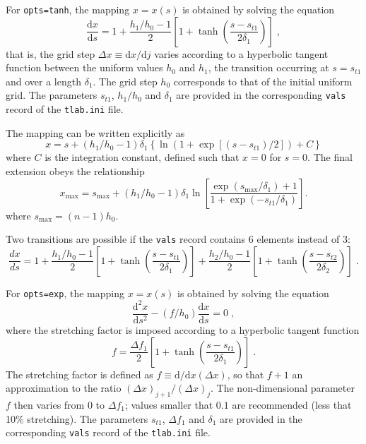 For {\tt opts=tanh}, the mapping $x=x(s)$ is obtained by solving the equation
\begin{equation}
\frac{\mathrm{d}x}{\mathrm{d}s} = 1 + \frac{h_1/h_0-1}{2}\left[ 1 + \tanh\left(\frac{s-s_{t1}}{2\delta_1}\right)\right] \;,
\end{equation}
that is, the grid step $\Delta x \equiv\mathrm{d}x/\mathrm{d}j$ varies according to a hyperbolic tangent function between the uniform values $h_0$ and $h_1$, the transition occurring at $s=s_{t1}$ and over a length $\delta_1$. The grid step $h_0$ corresponds to that of the initial uniform grid. The parameters $s_{t1}$, $h_1/h_0$ and $\delta_1$ are provided in the corresponding {\tt vals} record of the {\tt tlab.ini} file.

The mapping can be written explicitly as
\begin{equation}
  x = s + (h_1/h_0-1)\delta_1\left\{\ln(1+\exp[(s-s_{t1})/2])+C\right\}
\end{equation}
where $C$ is the integration constant, defined such that $x=0$ for $s=0$. The final extension obeys the relationship
\begin{equation}
  x_\mathrm{max}=s_\mathrm{max} + (h_1/h_0-1)\delta_1\ln\left[\frac{\exp(s_\mathrm{max}/\delta_1)+1}{1+\exp(-s_{t1}/\delta_1)}\right].
\end{equation}
where $s_\mathrm{max} =(n-1)h_0$.

Two transitions are possible if the {\tt vals} record contains 6 elements instead of 3:
\begin{equation}
\frac{dx}{ds} = 1
+ \frac{h_1/h_0-1}{2}\left[ 1 + \tanh\left(\frac{s-s_{t1}}{2\delta_1}\right)\right]
+ \frac{h_2/h_0-1}{2}\left[ 1 + \tanh\left(\frac{s-s_{t2}}{2\delta_2}\right)\right]\;.
\end{equation}

For {\tt opts=exp}, the mapping $x=x(s)$ is obtained by solving the equation
\begin{equation}
\frac{\mathrm{d}^2x}{\mathrm{d}s^2} - (f/h_0)\frac{\mathrm{d}x}{\mathrm{d}s} = 0 \;,
\end{equation}
where the stretching factor is imposed according to a hyperbolic tangent function
\begin{equation}
f = \frac{\Delta f_1}{2}\left[ 1 + \tanh\left(\frac{s-s_{t1}}{2\delta_1}\right)\right] \;.
\end{equation}
The stretching factor is defined as $f\equiv\mathrm{d}/\mathrm{d}x (\Delta x)$, so that $f+1$ an approximation to the ratio $(\Delta x)_{j+1}/(\Delta x) _{j}$. The non-dimensional parameter $f$ then varies from $0$ to $\Delta f_1$; values smaller that $0.1$ are recommended (less that 10\% stretching). The parameters $s_{t1}$, $\Delta f_1$ and $\delta_1$ are provided in the corresponding {\tt vals} record of the {\tt tlab.ini} file.

